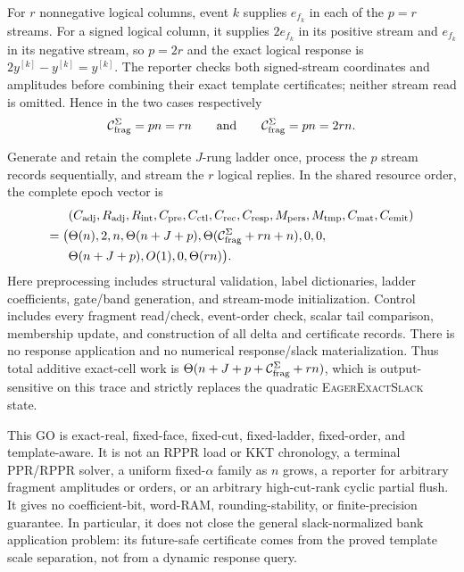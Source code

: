 \begin{theorem}
For $r$ nonnegative logical columns, event $k$ supplies $e_{f_k}$ in each of
the $p=r$ streams.  For a signed logical column, it supplies $2e_{f_k}$ in
its positive stream and $e_{f_k}$ in its negative stream, so $p=2r$ and the
exact logical response is $2y^{[k]}-y^{[k]}=y^{[k]}$.  The reporter checks
both signed-stream coordinates and amplitudes before combining their exact
template certificates; neither stream read is omitted.  Hence in the two
cases respectively
\begin{equation*}
 \mathcal C_{\rm frag}^{\Sigma}=pn=rn
 \qquad\text{and}\qquad
 \mathcal C_{\rm frag}^{\Sigma}=pn=2rn.
\end{equation*}

Generate and retain the complete $J$-rung ladder once, process the $p$ stream
records sequentially, and stream the $r$ logical replies.  In the shared
resource order, the complete epoch vector is
\begin{equation}
 \begin{aligned}
 &(C_{\rm adj},R_{\rm adj},R_{\rm int},C_{\rm pre},C_{\rm ctl},C_{\rm rec},
 C_{\rm resp},M_{\rm pers},M_{\rm tmp},C_{\rm mat},C_{\rm emit})\\
 =\bigl(&\Theta(n),2,n,\Theta(n+J+p),
 \Theta(\mathcal C_{\rm frag}^{\Sigma}+rn+n),0,0,\\
 &\Theta(n+J+p),O(1),0,\Theta(rn)\bigr).
 \end{aligned}
 \label{eq:notched-sun-scale-delta-eleven-vector}
\end{equation}
Here preprocessing includes structural validation, label dictionaries,
ladder coefficients, gate/band generation, and stream-mode initialization.
Control includes every fragment read/check, event-order check, scalar tail
comparison, membership update, and construction of all delta and certificate
records.  There is no response application and no numerical response/slack
materialization.  Thus total additive exact-cell work is
$\Theta(n+J+p+\mathcal C_{\rm frag}^{\Sigma}+rn)$, which is output-sensitive
on this trace and strictly replaces the quadratic
\textsc{EagerExactSlack} state.

This GO is exact-real, fixed-face, fixed-cut, fixed-ladder, fixed-order, and
template-aware.  It is not an RPPR load or KKT chronology, a terminal
PPR/RPPR solver, a uniform fixed-$\alpha$ family as $n$ grows, a reporter for
arbitrary fragment amplitudes or orders, or an arbitrary high-cut-rank cyclic
partial flush.  It gives no coefficient-bit, word-RAM, rounding-stability, or
finite-precision guarantee.  In particular, it does not close the general
slack-normalized bank application problem: its future-safe certificate comes
from the proved template scale separation, not from a dynamic response query.
\end{theorem}

